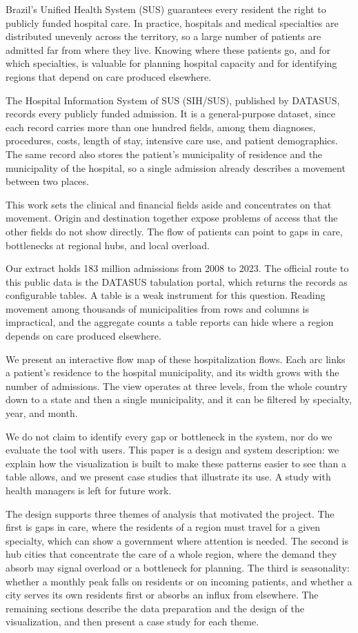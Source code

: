 Brazil's Unified Health System (SUS) guarantees every resident the right to publicly funded hospital care.
In practice, hospitals and medical specialties are distributed unevenly across the territory, so a large number of patients are admitted far from where they live.
Knowing where these patients go, and for which specialties, is valuable for planning hospital capacity and for identifying regions that depend on care produced elsewhere.

The Hospital Information System of SUS (SIH/SUS), published by DATASUS, records every publicly funded admission.
It is a general-purpose dataset, since each record carries more than one hundred fields, among them diagnoses, procedures, costs, length of stay, intensive care use, and patient demographics.
The same record also stores the patient's municipality of residence and the municipality of the hospital, so a single admission already describes a movement between two places.

This work sets the clinical and financial fields aside and concentrates on that movement.
Origin and destination together expose problems of access that the other fields do not show directly.
The flow of patients can point to gaps in care, bottlenecks at regional hubs, and local overload.

Our extract holds 183 million admissions from 2008 to 2023.
The official route to this public data is the DATASUS tabulation portal, which returns the records as configurable tables.
A table is a weak instrument for this question.
Reading movement among thousands of municipalities from rows and columns is impractical, and the aggregate counts a table reports can hide where a region depends on care produced elsewhere.

We present an interactive flow map of these hospitalization flows.
Each arc links a patient's residence to the hospital municipality, and its width grows with the number of admissions.
The view operates at three levels, from the whole country down to a state and then a single municipality, and it can be filtered by specialty, year, and month.

We do not claim to identify every gap or bottleneck in the system, nor do we evaluate the tool with users.
This paper is a design and system description: we explain how the visualization is built to make these patterns easier to see than a table allows, and we present case studies that illustrate its use.
A study with health managers is left for future work.

The design supports three themes of analysis that motivated the project.
The first is gaps in care, where the residents of a region must travel for a given specialty, which can show a government where attention is needed.
The second is hub cities that concentrate the care of a whole region, where the demand they absorb may signal overload or a bottleneck for planning.
The third is seasonality: whether a monthly peak falls on residents or on incoming patients, and whether a city serves its own residents first or absorbs an influx from elsewhere.
The remaining sections describe the data preparation and the design of the visualization, and then present a case study for each theme.
